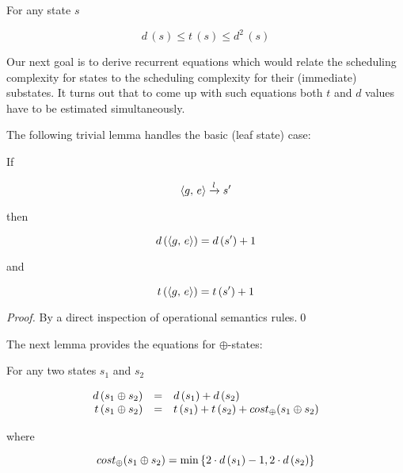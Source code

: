 \begin{lemma}
  For any state $s$

  \[
  d\,(s) \le t\,(s) \le d^2\,(s)
  \]
  
\end{lemma}

Our next goal is to derive recurrent equations which would relate the scheduling complexity for states to the scheduling complexity for their
(immediate) substates. It turns out that to come up with such equations both $t$ and $d$ values have to be estimated simultaneously.  



The following trivial lemma handles the basic (leaf state) case:

\begin{lemma}
  If

  \[\langle g ,\, e \rangle \xrightarrow{l} s^\prime\]

  then

  \[d\,(\langle g ,\, e \rangle) = d\,(s^\prime) + 1\]

  and

  \[t\,(\langle g ,\, e \rangle) = t\,(s^\prime) + 1\]
\end{lemma}
\begin{proof}
  By a direct inspection of operational semantics rules.\qed
\end{proof}


The next lemma provides the equations for $\oplus$-states:

\begin{lemma}
\label{lem:sum_estimation}
For any two states $s_1$ and $s_2$

\[
\begin{array}{rcl}
  d\,(s_1 \oplus s_2) &=& d\,(s_1) + d\,(s_2) \\

    t\,(s_1 \oplus s_2) &=& t\,(s_1) + t\,(s_2) + cost_{\oplus}(s_1 \oplus s_2)
\end{array}
\]

where

\[ cost_{\oplus}(s_1 \oplus s_2) = \min\,\{2\cdot d\,(s_1) - 1, 2\cdot d\,(s_2)\} \] 

\end{lemma}


